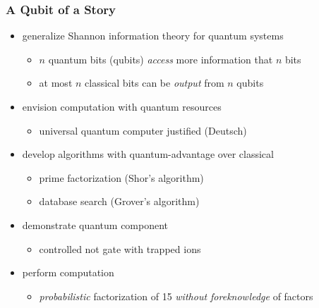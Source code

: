 \documentclass[handout]{beamer}
\begin{document}
\begin{frame}
  \frametitle{A Qubit of a Story}
  
  \begin{itemize}[<+->]
  \item generalize Shannon information theory for quantum systems 
    \begin{itemize}[<6->]
    \item $n$ quantum bits (qubits) \emph{access} more information that $n$
      bits
    \item at most $n$ classical bits can be \emph{output} from $n$ qubits
    \end{itemize}
  \item envision computation with quantum resources 
    \begin{itemize}[<6->]
    \item universal quantum computer justified (Deutsch) 
    \end{itemize}
  \item develop algorithms with quantum-advantage over classical 
    \begin{itemize}[<6->]
    \item prime factorization (Shor's algorithm) 
    \item database search (Grover's algorithm)
    \end{itemize}
  \item demonstrate quantum component 
    \begin{itemize}[<6->]
    \item controlled not gate with trapped ions 
    \end{itemize}
  \item perform computation 
    \begin{itemize}[<6->]
    \item \textcolor{orange!80!black}{\emph{probabilistic} factorization of \num{15} \emph{without foreknowledge} of factors}
    \end{itemize}
  \end{itemize}
\end{frame}
\end{document}
